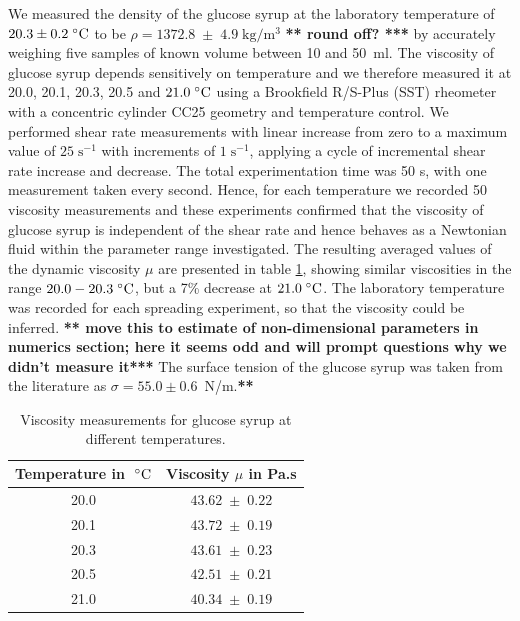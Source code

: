 \documentclass[aip,graphicx]{revtex4-1}
\newcommand{\sym}[1]{\text{#1}} \newcommand{\dif}{\mathrm{d}}
\begin{document}
We measured the density of the glucose syrup at the laboratory temperature
of $20.3 \pm 0.2 \; ^{\circ} \text{C}$ to be $\rho=1372.8 \; \pm \; 4.9 \;
\sym{kg}/\sym{m}^3$ {\bf *** round off? ***}  by accurately weighing five samples of known
volume between 10 and 50~ml.  The viscosity of glucose syrup depends
sensitively on temperature \cite{llewellin2002rheology} and we
therefore measured it at 20.0, 20.1, 20.3, 20.5 and $21.0 \; ^{\circ} \text{C}$
using a Brookfield R/S-Plus (SST) rheometer with a concentric cylinder
CC25 geometry and temperature control. We performed shear rate
measurements with linear increase from zero to a maximum value of $25
\; \sym{s}^{-1}$ with increments of $1 \; \sym{s}^{-1}$, applying a
cycle of incremental shear rate increase and decrease.  The total
experimentation time was 50 s, with one measurement taken every
second. Hence, for each temperature we recorded 50 viscosity
measurements and these experiments confirmed that the viscosity of
glucose syrup is independent of the shear rate and hence behaves as a
Newtonian fluid within the parameter range investigated. The resulting
averaged values of the dynamic viscosity $\mu$ are presented in table
\ref{tab:glucose_viscosity}, showing similar viscosities in the range
$20.0 - 20.3 \; ^{\circ} \text{C}$, but a 7\% decrease at $21.0 \; ^{\circ} \text{C}$. The
laboratory temperature was recorded for each spreading experiment, so
that the viscosity could be inferred. {\bf ***  move this to
  estimate of non-dimensional parameters in numerics section; here it
  seems odd and will prompt questions why we didn't measure it***}
The surface tension of the glucose syrup was taken from the 
literature \cite{montanez2013influence} as $\sigma=55.0 \pm 0.6$~N/m.{\bf ***}


{\renewcommand{\arraystretch}{1.2}
 \begin{table}[!ht]
 \begin{center}
 \begin{tabular}{c | c}
  Temperature in $\; ^{\circ} \text{C}$ & Viscosity $\mu$ in Pa.s \\ \hline 20.0 &
  $43.62 \; \pm \; 0.22$ \\ 20.1 & $43.72 \; \pm \; 0.19$ \\ 20.3 &
  $43.61 \; \pm \; 0.23$ \\ 20.5 & $42.51 \; \pm \; 0.21$ \\ 21.0 &
  $40.34 \; \pm \; 0.19$\\
 \end{tabular}
 \caption{Viscosity measurements for glucose syrup at different
   temperatures.}
 \label{tab:glucose_viscosity}
 \end{center}
 \end{table}}
\end{document}
